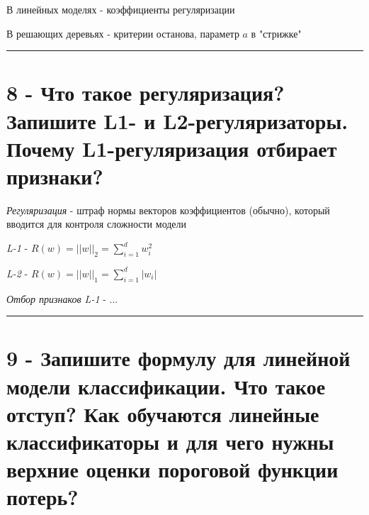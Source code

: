 \documentclass[11pt]{article}
\begin{document}
В линейных моделях - коэффициенты регуляризации

В решающих деревьях - критерии останова, параметр \(a\) в "стрижке"

    \begin{center}\rule{0.5\linewidth}{\linethickness}\end{center}

    \section{8 - Что такое регуляризация? Запишите L1- и L2-регуляризаторы.
Почему L1-регуляризация отбирает
признаки?}\label{ux447ux442ux43e-ux442ux430ux43aux43eux435-ux440ux435ux433ux443ux43bux44fux440ux438ux437ux430ux446ux438ux44f-ux437ux430ux43fux438ux448ux438ux442ux435-l1--ux438-l2-ux440ux435ux433ux443ux43bux44fux440ux438ux437ux430ux442ux43eux440ux44b.-ux43fux43eux447ux435ux43cux443-l1-ux440ux435ux433ux443ux43bux44fux440ux438ux437ux430ux446ux438ux44f-ux43eux442ux431ux438ux440ux430ux435ux442-ux43fux440ux438ux437ux43dux430ux43aux438}

\emph{Регуляризация} - штраф нормы векторов коэффициентов (обычно),
который вводится для контроля сложности модели

\emph{L-1} - \(R(w) = ||w||_2 = \sum_{i=1}^dw_i^2\)

\emph{L-2} - \(R(w) = ||w||_1 = \sum_{i=1}^d|w_i|\)

\emph{Отбор признаков L-1} - ...

    \begin{center}\rule{0.5\linewidth}{\linethickness}\end{center}

    \section{9 - Запишите формулу для линейной модели классификации. Что
такое отступ? Как обучаются линейные классификаторы и для чего нужны
верхние оценки пороговой функции
потерь?}\label{ux437ux430ux43fux438ux448ux438ux442ux435-ux444ux43eux440ux43cux443ux43bux443-ux434ux43bux44f-ux43bux438ux43dux435ux439ux43dux43eux439-ux43cux43eux434ux435ux43bux438-ux43aux43bux430ux441ux441ux438ux444ux438ux43aux430ux446ux438ux438.-ux447ux442ux43e-ux442ux430ux43aux43eux435-ux43eux442ux441ux442ux443ux43f-ux43aux430ux43a-ux43eux431ux443ux447ux430ux44eux442ux441ux44f-ux43bux438ux43dux435ux439ux43dux44bux435-ux43aux43bux430ux441ux441ux438ux444ux438ux43aux430ux442ux43eux440ux44b-ux438-ux434ux43bux44f-ux447ux435ux433ux43e-ux43dux443ux436ux43dux44b-ux432ux435ux440ux445ux43dux438ux435-ux43eux446ux435ux43dux43aux438-ux43fux43eux440ux43eux433ux43eux432ux43eux439-ux444ux443ux43dux43aux446ux438ux438-ux43fux43eux442ux435ux440ux44c}
\end{document}
